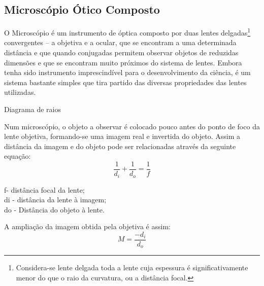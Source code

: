 \documentclass{article}
\begin{document}
\begin{multicols}{2}
\section*{Microscópio Ótico Composto}

   O Microscópio é um instrumento de óptica composto por duas lentes delgadas\footnote{ Considera-se lente delgada toda a lente cuja espessura é significativamente menor do que o raio da curvatura, ou a distância focal.} convergentes – a objetiva e a ocular, que se encontram a uma determinada distância e que quando conjugadas permitem observar objetos de reduzidas dimensões e que se encontram muito próximos do sistema de lentes. Embora tenha sido instrumento imprescindível para o desenvolvimento da ciência, é um sistema bastante simples que tira partido das diversas propriedades das lentes utilizadas.


\begin{center}
\end{center}
\vskip -3mm\centerline{Diagrama de raios}
\vskip 2mm

Num microscópio, o objeto a observar é colocado pouco antes do ponto de foco da lente objetiva, formando-se uma imagem real e invertida do objeto. Assim a distância da imagem e do objeto pode ser relacionadas através da seguinte equação:
\begin{equation}
\frac{1}{d_{i}} + \frac{1}{d_{o}}=\frac{1}{f}
\end{equation}
\begin{flushright}
f- distância focal da lente;\\
d{\tiny i} - distância da lente à imagem;\\
d{\tiny o } - Distância do objeto à lente.\\
\end{flushright}

A ampliação da imagem obtida pela objetiva é assim:
\begin{equation}
M=\frac{-d_{i}}{d_{o}}
\end{equation}


\end{multicols}
\end{document}
